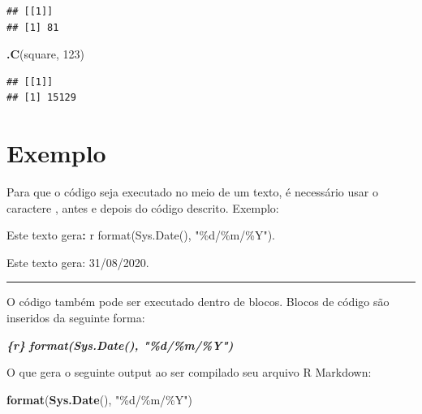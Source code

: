 \documentclass[
]{book}
\newenvironment{Shaded}{\begin{snugshade}}{\end{snugshade}}
\newcommand{\DataTypeTok}[1]{\textcolor[rgb]{0.13,0.29,0.53}{#1}}
\newcommand{\DecValTok}[1]{\textcolor[rgb]{0.00,0.00,0.81}{#1}}
\newcommand{\InformationTok}[1]{\textcolor[rgb]{0.56,0.35,0.01}{\textbf{\textit{#1}}}}
\newcommand{\KeywordTok}[1]{\textcolor[rgb]{0.13,0.29,0.53}{\textbf{#1}}}
\newcommand{\NormalTok}[1]{#1}
\newcommand{\OperatorTok}[1]{\textcolor[rgb]{0.81,0.36,0.00}{\textbf{#1}}}
\newcommand{\StringTok}[1]{\textcolor[rgb]{0.31,0.60,0.02}{#1}}
\begin{document}
\begin{verbatim}
## [[1]]
## [1] 81
\end{verbatim}

\begin{Shaded}
\begin{Highlighting}[]
\KeywordTok{.C}\NormalTok{(}\StringTok{\textquotesingle{}square\textquotesingle{}}\NormalTok{, }\DecValTok{123}\NormalTok{)}
\end{Highlighting}
\end{Shaded}

\begin{verbatim}
## [[1]]
## [1] 15129
\end{verbatim}

\hypertarget{exemplo}{%
\section{Exemplo}\label{exemplo}}

Para que o código seja executado no meio de um texto, é necessário usar o caractere \texttt{\textasciigrave{}}, antes e depois do código descrito. Exemplo:

\begin{Shaded}
\begin{Highlighting}[]
\NormalTok{Este texto gera}\OperatorTok{:}\StringTok{ \textasciigrave{}}\DataTypeTok{r format(Sys.Date(), "\%d/\%m/\%Y")}\StringTok{\textasciigrave{}}\NormalTok{.}
\end{Highlighting}
\end{Shaded}

Este texto gera: 31/08/2020.

\begin{center}\rule{0.5\linewidth}{0.5pt}\end{center}

O código também pode ser executado dentro de blocos. Blocos de código são inseridos da seguinte forma:

\begin{Shaded}
\begin{Highlighting}[]
\InformationTok{\textasciigrave{}\textasciigrave{}\textasciigrave{}\{r\}}
\InformationTok{format(Sys.Date(), "\%d/\%m/\%Y")}
\InformationTok{\textasciigrave{}\textasciigrave{}\textasciigrave{}}
\end{Highlighting}
\end{Shaded}

O que gera o seguinte output ao ser compilado seu arquivo R Markdown:

\begin{Shaded}
\begin{Highlighting}[]
\KeywordTok{format}\NormalTok{(}\KeywordTok{Sys.Date}\NormalTok{(), }\StringTok{"\%d/\%m/\%Y"}\NormalTok{)}
\end{Highlighting}
\end{Shaded}
\end{document}
